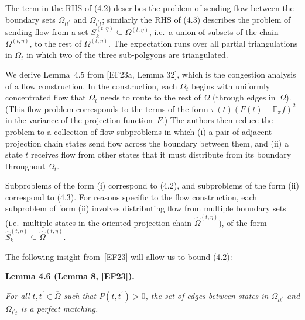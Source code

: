 \documentclass[10pt,a4paper]{article}
\begin{document}



The term in the RHS of (4.2) describes the problem of sending flow between the boundary sets $\Omega_{tt^{\prime}}$ and $\Omega_{t^{\prime}t}$; similarly the RHS of (4.3) describes the problem of sending flow from a set $S_{k}^{(t,\eta)}\subseteq\Omega^{(t,\eta)}$, i.e. a union of subsets of the chain $\Omega^{(t,\eta)}$, to the rest of $\Omega^{(t,\eta)}$. The expectation runs over all partial triangulations in $\Omega_{t}$ in which two of the three sub-polgyons are triangulated.\par




We derive Lemma 4.5 from [EF23a, Lemma 32], which is the congestion analysis of a flow construction. In the construction, each $\Omega_{t}$ begins with uniformly concentrated flow that $\Omega_{t}$ needs to route to the rest of $\Omega$ (through edges in $\Omega$). (This flow problem corresponds to the terms of the form $\overline{\pi}(t)(F(t)-\mathbb{E}_{\pi}f)^{2}$ in the variance of the projection function $F$.) The authors then reduce the problem to a collection of flow subproblems in which (i) a pair of adjacent projection chain states send flow across the boundary between them, and (ii) a state $t$ receives flow from other states that it must distribute from its boundary throughout $\Omega_{t}$.\par




Subproblems of the form (i) correspond to (4.2), and subproblems of the form (ii) correspond to (4.3). For reasons specific to the flow construction, each subproblem of form (ii) involves distributing flow from multiple boundary sets (i.e. multiple states in the oriented projection chain $\hat{\Omega}^{(t,\eta)}$), of the form $\hat{S}_{k}^{(t,\eta)}\subseteq\hat{\Omega}^{(t,\eta)}$.\par




The following insight from [EF23] will allow us to bound (4.2):\par





\par\medskip\noindent\textbf{\textbf{Lemma 4.6}\textbf{ }(Lemma 8, [EF23])\textbf{.}}\par



\emph{For all $t,t^{\prime}\in\overline{\Omega}$ such that $P(t,t^{\prime})>0$,
the set of edges between states in $\Omega_{tt^{\prime}}$ and $\Omega_{t^{\prime}t}$ is a perfect matching.}\par
\end{document}
